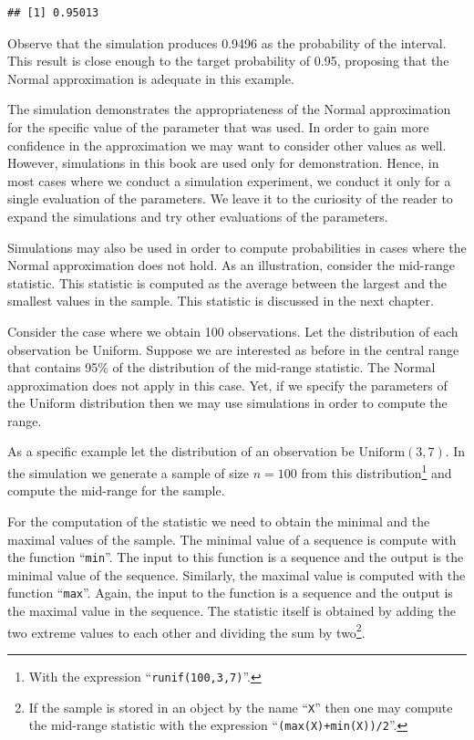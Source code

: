 \documentclass[]{krantz}
\theoremstyle{definition}
\theoremstyle{definition}
\theoremstyle{definition}
\theoremstyle{remark}
\begin{document}
\begin{verbatim}
## [1] 0.95013
\end{verbatim}

Observe that the simulation produces 0.9496 as the probability of the
interval. This result is close enough to the target probability of 0.95,
proposing that the Normal approximation is adequate in this example.

The simulation demonstrates the appropriateness of the Normal
approximation for the specific value of the parameter that was used. In
order to gain more confidence in the approximation we may want to
consider other values as well. However, simulations in this book are
used only for demonstration. Hence, in most cases where we conduct a
simulation experiment, we conduct it only for a single evaluation of the
parameters. We leave it to the curiosity of the reader to expand the
simulations and try other evaluations of the parameters.

Simulations may also be used in order to compute probabilities in cases
where the Normal approximation does not hold. As an illustration,
consider the mid-range statistic. This statistic is computed as the
average between the largest and the smallest values in the sample. This
statistic is discussed in the next chapter.

Consider the case where we obtain 100 observations. Let the distribution
of each observation be Uniform. Suppose we are interested as before in
the central range that contains 95\% of the distribution of the mid-range
statistic. The Normal approximation does not apply in this case. Yet, if
we specify the parameters of the Uniform distribution then we may use
simulations in order to compute the range.

As a specific example let the distribution of an observation be
\(\mathrm{Uniform}(3,7)\). In the simulation we generate a sample of size
\(n=100\) from this distribution\footnote{With the expression ``\texttt{runif(100,3,7)}''.} and compute the mid-range for the
sample.

For the computation of the statistic we need to obtain the minimal and
the maximal values of the sample. The minimal value of a sequence is
compute with the function ``\texttt{min}''. The input to this function is a
sequence and the output is the minimal value of the sequence. Similarly,
the maximal value is computed with the function ``\texttt{max}''. Again, the
input to the function is a sequence and the output is the maximal value
in the sequence. The statistic itself is obtained by adding the two
extreme values to each other and dividing the sum by two\footnote{If the sample is stored in an object by the name ``\texttt{X}'' then one
  may compute the mid-range statistic with the expression
  ``\texttt{(max(X)+min(X))/2}''.}.
\end{document}
